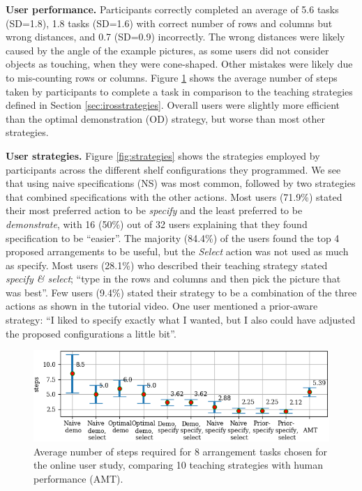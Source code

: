 \noindent
\textbf{User performance.} Participants correctly completed an average of 5.6 tasks (SD=1.8), 1.8 tasks (SD=1.6) with correct number of rows and columns but wrong distances, and 0.7 (SD=0.9) incorrectly.
The wrong distances were likely caused by the angle of the example pictures, as some users did not consider objects as touching, \eg when they were cone-shaped.
Other mistakes were likely due to mis-counting rows or columns.
Figure \ref{fig:avgSteps-AMT} shows the average number of  steps taken by participants to complete a task in comparison to the teaching strategies defined in Section \ref{sec:irosstrategies}. 
Overall users were slightly more efficient than the optimal demonstration (OD) strategy, but worse than most other strategies. 

\noindent
\textbf{User strategies.} Figure \ref{fig:strategies} shows the strategies employed by participants across the different shelf configurations they programmed.
We see that using naive specifications (NS) was most common, followed by two strategies that combined specifications with the other actions.
Most users (71.9\%) stated their most preferred action to be \textit{specify} and the least preferred to be \textit{demonstrate}, with 16 (50\%) out of 32 users explaining that they found specification to be ``easier''.
The majority (84.4\%) of the users found the top 4 proposed arrangements to be useful, but the \textit{Select} action was not used as much as specify.
Most users (28.1\%) who described their teaching strategy stated \textit{specify \& select}; \eg ``type in the rows and columns and then pick the picture that was best''.
Few users (9.4\%) stated their strategy to be a combination of the three actions as shown in the tutorial video. 
One user mentioned a prior-aware strategy: ``I liked to specify exactly what I wanted, but I also could have adjusted the proposed configurations a little bit''. %

\begin{figure}[h]
	\includegraphics[width=\linewidth]{figures/avgSteps-8-AMT}
	\caption{Average number of steps required for 8 arrangement tasks chosen for the online user study, comparing 10 teaching strategies with human performance (AMT).}
	\label{fig:avgSteps-AMT}
\end{figure}

